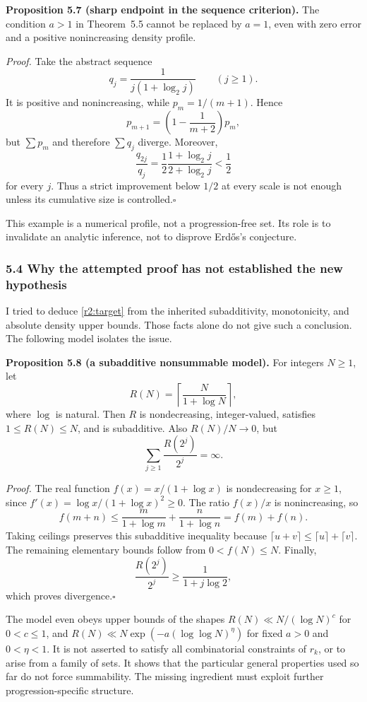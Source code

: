 \noindent\textbf{Proposition 5.7 (sharp endpoint in the sequence criterion).}
The condition $a>1$ in Theorem~5.5 cannot be replaced by $a=1$, even with zero error and a positive nonincreasing density profile.

\noindent\emph{Proof.}
Take the abstract sequence
\[
q_j=\frac{1}{j(1+\log_2j)}\qquad(j\ge1).
\]
It is positive and nonincreasing, while $p_m=1/(m+1)$. Hence
\[
p_{m+1}=\left(1-\frac1{m+2}\right)p_m,
\]
but $\sum p_m$ and therefore $\sum q_j$ diverge. Moreover,
\[
\frac{q_{2j}}{q_j}=\frac12\frac{1+\log_2j}{2+\log_2j}<\frac12
\]
for every $j$. Thus a strict improvement below $1/2$ at every scale is not enough unless its cumulative size is controlled.\hfill$\square$

This example is a numerical profile, not a progression-free set. Its role is to invalidate an analytic inference, not to disprove Erd\H{o}s's conjecture.

\subsubsection{5.4 Why the attempted proof has not established the new hypothesis}

I tried to deduce \eqref{r2:target} from the inherited subadditivity, monotonicity, and absolute density upper bounds. Those facts alone do not give such a conclusion. The following model isolates the issue.

\noindent\textbf{Proposition 5.8 (a subadditive nonsummable model).}
For integers $N\ge1$, let
\[
R(N)=\left\lceil\frac{N}{1+\log N}\right\rceil,
\]
where $\log$ is natural. Then $R$ is nondecreasing, integer-valued, satisfies $1\le R(N)\le N$, and is subadditive. Also $R(N)/N\to0$, but
\[
\sum_{j\ge1}\frac{R(2^j)}{2^j}=\infty.
\]

\noindent\emph{Proof.}
The real function $f(x)=x/(1+\log x)$ is nondecreasing for $x\ge1$, since $f'(x)=\log x/(1+\log x)^2\ge0$. The ratio $f(x)/x$ is nonincreasing, so
\[
f(m+n)\le\frac{m}{1+\log m}+\frac{n}{1+\log n}=f(m)+f(n).
\]
Taking ceilings preserves this subadditive inequality because $\lceil u+v\rceil\le\lceil u\rceil+\lceil v\rceil$. The remaining elementary bounds follow from $0<f(N)\le N$. Finally,
\[
\frac{R(2^j)}{2^j}\ge\frac{1}{1+j\log2},
\]
which proves divergence.\hfill$\square$

The model even obeys upper bounds of the shapes $R(N)\ll N/(\log N)^c$ for $0<c\le1$, and $R(N)\ll N\exp(-a(\log\log N)^\eta)$ for fixed $a>0$ and $0<\eta<1$. It is not asserted to satisfy all combinatorial constraints of $r_k$, or to arise from a family of sets. It shows that the particular general properties used so far do not force summability. The missing ingredient must exploit further progression-specific structure.

